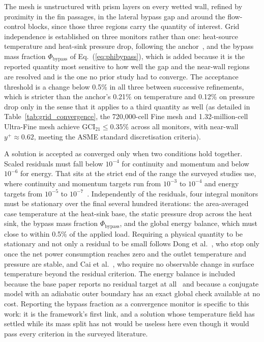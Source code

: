 The mesh is unstructured with prism layers on every wetted wall, refined by proximity in the fin
passages, in the lateral bypass gap and around the flow-control blocks, since those three regions
carry the quantity of interest. Grid independence is established on three monitors rather than one:
heat-source temperature and heat-sink pressure drop, following the anchor~\cite{chun2026}, and the
bypass mass fraction $\Phi_{\mathrm{bypass}}$ of Eq.~(\ref{eq:phibypass}), which is added because
it is the reported quantity most sensitive to how well the gap and the near-wall regions are
resolved and is the one no prior study had to converge. The acceptance threshold is a change below
0.5\% in all three between successive refinements, which is stricter than the anchor's 0.21\% on
temperature and 0.12\% on pressure drop only in the sense that it applies to a third quantity as
well (as detailed in Table~\ref{tab:grid_convergence}, the 720,000-cell Fine mesh and 1.32-million-cell Ultra-Fine mesh achieve $\mathrm{GCI}_{21} \le 0.35\%$ across all monitors, with near-wall $y^+ \approx 0.62$, meeting the ASME standard discretisation criteria).

A solution is accepted as converged only when two conditions hold together. Scaled residuals must
fall below $10^{-4}$ for continuity and momentum and below $10^{-6}$ for energy. That sits at the
strict end of the range the surveyed studies use, where continuity and momentum targets run from
$10^{-3}$ to $10^{-4}$ and energy targets from $10^{-5}$ to
$10^{-7}$~\cite{chun2026,dong2026,huang2023ijhmt,ni2024,kim2025,zhang2026}. Independently of the
residuals, four integral monitors must be stationary over the final several hundred iterations: the
area-averaged case temperature at the heat-sink base, the static pressure drop across the heat
sink, the bypass mass fraction $\Phi_{\mathrm{bypass}}$, and the global energy balance, which must
close to within 0.5\% of the applied load. Requiring a physical quantity to be stationary and not
only a residual to be small follows Dong et al.~\cite{dong2026}, who stop only once the net power
consumption reaches zero and the outlet temperature and pressure are stable, and Cai et
al.~\cite{cai2019}, who require no observable change in surface temperature beyond the residual
criterion. The energy balance is included because the base paper reports no residual target at
all~\cite{muneeshwaran2023} and because a conjugate model with an adiabatic outer boundary has an
exact global check available at no cost. Reporting the bypass fraction as a convergence monitor is
specific to this work: it is the framework's first link, and a solution whose temperature field has
settled while its mass split has not would be useless here even though it would pass every criterion
in the surveyed literature.
